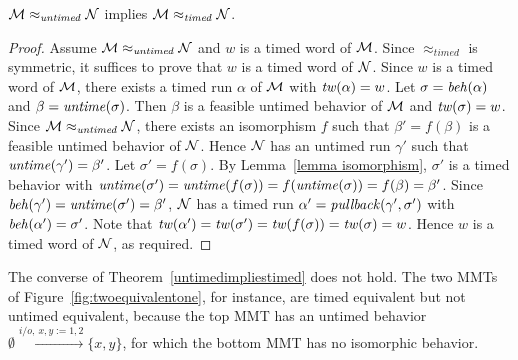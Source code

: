 \begin{theorem}
\label{untimedimpliestimed}
${\cal M} \approx_{\mathit{untimed}} {\cal N}$
implies
${\cal M} \approx_{\mathit{timed}} {\cal N}$.
\end{theorem}
\iflong
\begin{proof}
Assume ${\cal M} \approx_{\mathit{untimed}} {\cal N}$ and $w$ is a timed word of ${\cal M}$.
Since $\approx_{\mathit{timed}}$ is symmetric, it suffices to prove that $w$ is a timed word of ${\cal N}$.
Since $w$ is a timed word of ${\cal M}$,
there exists a timed run $\alpha$ of ${\cal M}$ with $\mathit{tw}(\alpha) = w$. 
Let $\sigma = \mathit{beh}(\alpha)$ and $\beta = \mathit{untime}(\sigma)$. 
Then $\beta$ is a feasible untimed behavior of ${\cal M}$ and $\mathit{tw}(\sigma) = w$.
Since  ${\cal M} \approx_{\mathit{untimed}} {\cal N}$, there exists an isomorphism $f$ such that 
$\beta' = f(\beta)$ is a feasible untimed behavior of ${\cal N}$.
Hence ${\cal N}$ has an untimed run $\gamma'$ such that $\mathit{untime}(\gamma') = \beta'$.
Let $\sigma' = f(\sigma)$.
By Lemma~\ref{lemma isomorphism}, $\sigma'$ is a timed behavior with 
$\mathit{untime}(\sigma') = \mathit{untime}(f(\sigma)) = f(\mathit{untime}(\sigma)) = f(\beta) = \beta'$.
Since $\mathit{beh}(\gamma') = \mathit{untime}(\sigma') = \beta'$, ${\cal N}$ has a timed run $\alpha' = \mathit{pullback}(\gamma',\sigma')$ with
$\mathit{beh}(\alpha') = \sigma'$.
Note that $\mathit{tw}(\alpha') = \mathit{tw}(\sigma') = \mathit{tw}(f(\sigma)) = \mathit{tw}(\sigma) = w$.
Hence $w$ is a timed word of ${\cal N}$, as required.
\end{proof}
\fi
The converse of Theorem~\ref{untimedimpliestimed} does not hold. 
The two MMTs of Figure~\ref{fig:twoequivalentone}, for instance,
are timed equivalent but not untimed equivalent,
because the top MMT has an untimed behavior
$ \emptyset \xrightarrow{i/o,~ x, y:=1,2 } \{ x, y \}$, for which the bottom MMT has no isomorphic behavior.
